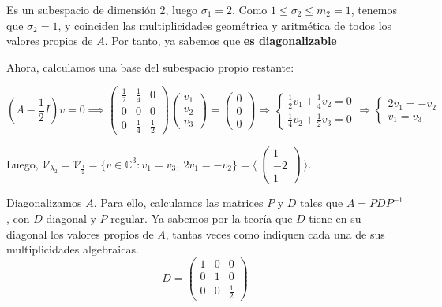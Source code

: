 \begin{nlist}
  Es un subespacio de dimensión 2, luego $\sigma_1 = 2$. Como $1\le\sigma_2\le m_2 = 1$, tenemos que $\sigma_2=1$, y coinciden las multiplicidades geométrica y aritmética de todos los valores propios de $A$. Por tanto, ya sabemos que \textbf{es diagonalizable}

  Ahora, calculamos una base del subespacio propio restante:

  $$\left(A - \frac{1}{2}I\right)v = 0 \implies
  \begin{pmatrix}
    \frac{1}{2} & \frac{1}{4} & 0 \\
    0 & 0 & 0 \\
    0 & \frac{1}{4} & \frac{1}{2}
  \end{pmatrix}
  \begin{pmatrix}
    v_1 \\
    v_2 \\
    v_3
  \end{pmatrix} =
  \begin{pmatrix}
    0 \\
    0 \\
    0
  \end{pmatrix} \Rightarrow
  \begin{cases}
    \frac{1}{2}v_1 + \frac{1}{4}v_2 = 0 \\
    \frac{1}{4}v_2 + \frac{1}{2}v_3 = 0
  \end{cases} \Rightarrow
  \begin{cases}
    2v_1 = -v_2 \\
    v_1 = v_3
  \end{cases}$$

  Luego, $\mathcal V_{\lambda_2} = \mathcal V_{\frac{1}{2}} = \{ v \in \mathbb C^3 : v_1 = v_3,\ 2v_1 = -v_2 \} =
  \langle\
  \begin{pmatrix}
    1 \\
    -2 \\
    1
  \end{pmatrix}\ \rangle$.

\item Diagonalizamos $A$. Para ello, calculamos las matrices $P$ y $D$ tales que $A = PDP^{-1}$, con $D$ diagonal y $P$ regular. Ya sabemos por la teoría que $D$ tiene en su diagonal los valores propios de $A$, tantas veces como indiquen cada una de sus multiplicidades algebraicas.
$$D =
\begin{pmatrix}
  1 & 0 & 0 \\
  0 & 1 & 0 \\
  0 & 0 & \frac{1}{2}
\end{pmatrix}$$


\end{nlist}
